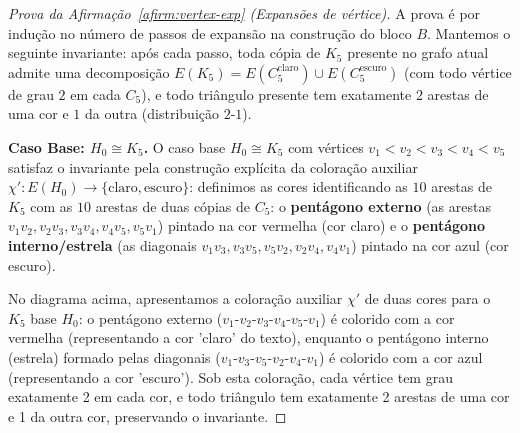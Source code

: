 \documentclass[reqno, 12pt]{amsart}
\numberwithin{equation}{section}
\theoremstyle{plain}
\theoremstyle{definition}
\begin{document}

\begin{proof}[Prova da Afirmação~\ref{afirm:vertex-exp} (Expansões de vértice)]
    A prova é por indução no número de passos de expansão na construção do bloco $B$.
    Mantemos o seguinte invariante: após cada passo, toda cópia de $K_5$ presente no grafo
    atual admite uma decomposição $E(K_5) = E(C_5^{\text{claro}}) \cup E(C_5^{\text{escuro}})$
    (com todo vértice de grau $2$ em cada $C_5$), e todo triângulo presente tem exatamente
    $2$ arestas de uma cor e $1$ da outra (distribuição $2$-$1$).

    \medskip
    \noindent\textbf{Caso Base: $H_0 \cong K_5$.}
    O caso base $H_0 \cong K_5$ com vértices $v_1 < v_2 < v_3 < v_4 < v_5$ satisfaz o invariante pela construção explícita da coloração auxiliar $\chi': E(H_0) \to \{\text{claro}, \text{escuro}\}$: definimos as cores identificando as $10$ arestas de $K_5$ com as $10$ arestas de duas cópias de $C_5$: o \textbf{pentágono externo} (as arestas $v_1v_2, v_2v_3, v_3v_4, v_4v_5, v_5v_1$) pintado na cor vermelha (cor claro) e o \textbf{pentágono interno/estrela} (as diagonais $v_1v_3, v_3v_5, v_5v_2, v_2v_4, v_4v_1$) pintado na cor azul (cor escuro).

    \begin{center}
    \end{center}
    \noindent
    No diagrama acima, apresentamos a coloração auxiliar $\chi'$ de duas cores para o $K_5$ base $H_0$: o pentágono externo ($v_1\text{-}v_2\text{-}v_3\text{-}v_4\text{-}v_5\text{-}v_1$) é colorido com a cor vermelha (representando a cor 'claro' do texto), enquanto o pentágono interno (estrela) formado pelas diagonais ($v_1\text{-}v_3\text{-}v_5\text{-}v_2\text{-}v_4\text{-}v_1$) é colorido com a cor azul (representando a cor 'escuro'). Sob esta coloração, cada vértice tem grau exatamente 2 em cada cor, e todo triângulo tem exatamente 2 arestas de uma cor e 1 da outra cor, preservando o invariante.


\end{proof}
\end{document}
